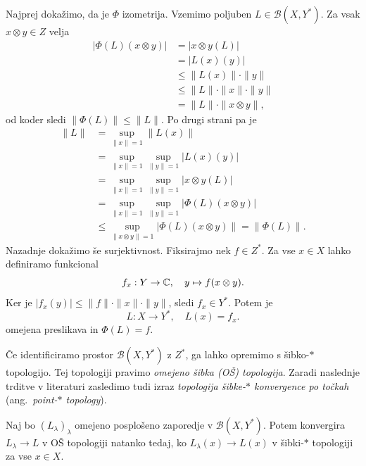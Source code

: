 \begin{dokaz}
    Najprej dokažimo, da je $\Phi$ izometrija. Vzemimo poljuben $L \in \mathcal{B}(X, Y^*)$.
    Za vsak $x \otimes y \in Z$ velja
    \begin{align*}
        | \Phi (L) (x \otimes y)| &= | x \otimes y (L)|\\
        &= | L(x) (y) |\\
        &\leq \| L(x)\| \cdot \| y\|\\
        &\leq \| L\| \cdot \| x\| \cdot \| y\|\\
        &= \| L \| \cdot \| x \otimes y\|,
    \end{align*}
    od koder sledi $\| \Phi(L) \| \leq \| L\|$. Po drugi strani pa je
    \begin{align*}
        \| L\| &= \sup_{\| x\| = 1} \| L(x) \| \\
        &= \sup_{\| x\| = 1} \sup_{\| y\| = 1} | L(x) (y)|\\
        &= \sup_{\| x\| = 1} \sup_{\| y\| = 1} | x \otimes y (L)|\\
        &= \sup_{\| x\| = 1} \sup_{\| y\| = 1} | \Phi (L) (x \otimes y)|\\
        &\leq \sup_{\| x \otimes y\| = 1} |\Phi (L) (x \otimes y)\| = \| \Phi (L)\|. 
    \end{align*}
    Nazadnje dokažimo še surjektivnost. Fiksirajmo nek $f \in Z^*$.
    Za vse $x \in X$ lahko definiramo funkcional
    $$f_x : Y \to \mathbb C,\quad y \mapsto f(x \otimes y).$$
    Ker je $| f_x (y)| \leq \| f\| \cdot \| x\| \cdot \| y\|$, sledi $f_x \in Y^*$.
    Potem je $$L : X \to Y^*,\quad L(x) = f_x.$$
    omejena preslikava in $\Phi(L) = f$. 
\end{dokaz}

Če identificiramo prostor $\mathcal{B} (X, Y^*)$ z $Z^*$, ga lahko opremimo s šibko-$*$ topologijo.
Tej topologiji pravimo \emph{omejeno šibka (OŠ) topologija}. Zaradi naslednje trditve v literaturi zasledimo tudi izraz 
\emph{topologija šibke-$*$ konvergence po točkah} (ang.~\emph{point-$*$ topology}).

\begin{lema}
    Naj bo $(L_\lambda)_{\lambda}$ omejeno posplošeno zaporedje v $\mathcal{B}(X, Y^*)$.
    Potem konvergira $L_\lambda \xrightarrow{} L$ v OŠ topologiji natanko tedaj, ko $L_\lambda (x) \xrightarrow{} L(x)$ v šibki-$*$ topologiji za vse $x \in X$.
\end{lema}

